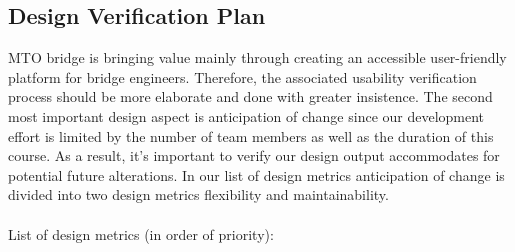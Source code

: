 \documentclass[12pt, titlepage]{article}
\begin{document}
\subsection{Design Verification Plan}

MTO bridge is bringing value mainly through creating an accessible user-friendly platform for bridge engineers. Therefore, the associated usability verification process should be more elaborate and done with greater insistence. The second most important design aspect is anticipation of change since our development effort is limited by the number of team members as well as the duration of this course. As a result, it’s important to verify our design output accommodates for potential future alterations. In our list of design metrics anticipation of change is divided into two design metrics flexibility and maintainability.\\\\
List of design metrics (in order of priority):
\end{document}
